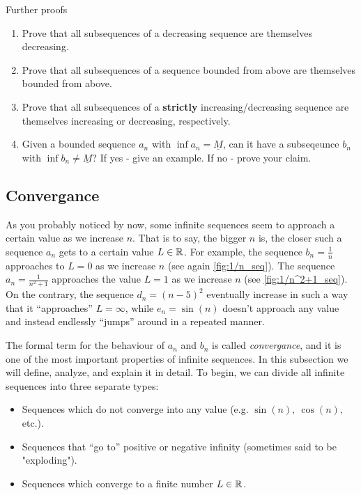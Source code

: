 \begin{challenge}{Further proofs}{}
	\begin{enumerate}
		\item Prove that all subsequences of a decreasing sequence are themselves decreasing.
		\item Prove that all subsequences of a sequence bounded from above are themselves bounded from above.
		\item Prove that all subsequences of a \textbf{strictly} increasing/decreasing sequence are themselves increasing or decreasing, respectively.
		\item Given a bounded sequence $a_{n}$ with $\inf a_{n}=\underline{M}$, can it have a subseqeunce $b_{n}$ with $\inf b_{n}\neq \underline{M}$? If yes - give an example. If no - prove your claim.
	\end{enumerate}
\end{challenge}

\subsection{Convergance}
As you probably noticed by now, some infinite sequences seem to approach a certain value as we increase $n$. That is to say, the bigger $n$ is, the closer such a sequence $a_{n}$ gets to a certain value $L\in\mathbb{R}^{}$. For example, the sequence $b_{n}=\frac{1}{n}$ approaches to $L=0$ as we increase $n$ (see again \autoref{fig:1/n_seq}). The sequence $a_{n}=\frac{1}{n^{2}+1}$ approaches the value $L=1$ as we increase $n$ (see \autoref{fig:1/n^2+1_seq}). On the contrary, the sequence $d_{n}=(n-5)^{2}$ eventually increase in such a way that it ``approaches'' $L=\infty$, while $e_{n}=\sin(n)$ doesn't approach any value and instead endlessly ``jumps'' around in a repeated manner.

The formal term for the behaviour of $a_{n}$ and $b_{n}$ is called \emph{convergance}, and it is one of the most important properties of infinite sequences. In this subsection we will define, analyze, and explain it in detail. To begin, we can divide all infinite sequences into three separate types:
\begin{itemize}
	\item Sequences which do not converge into any value (e.g. $\sin(n),\ \cos(n),$ etc.).
	\item Sequences that ``go to'' positive or negative infinity (sometimes said to be "exploding").
	\item Sequences which converge to a finite number $L\in\mathbb{R}^{}$.
\end{itemize}


